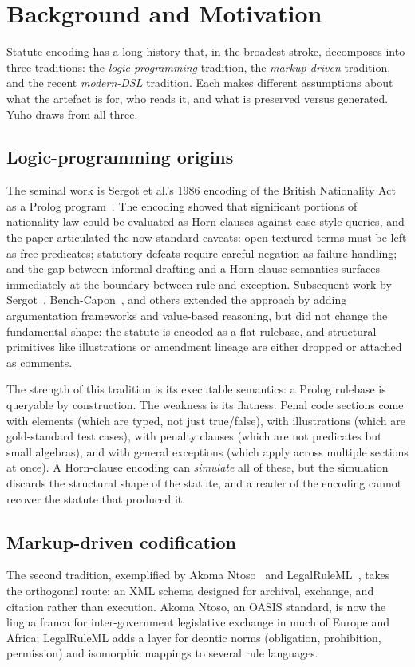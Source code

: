 \section{Background and Motivation}
\label{sec:background}

Statute encoding has a long history that, in the broadest stroke, decomposes
into three traditions: the \emph{logic-programming} tradition, the
\emph{markup-driven} tradition, and the recent \emph{modern-DSL} tradition.
Each makes different assumptions about what the artefact is for, who reads
it, and what is preserved versus generated. Yuho draws from all three.

\subsection{Logic-programming origins}
The seminal work is Sergot et al.'s 1986 encoding of the British Nationality
Act as a Prolog program~\cite{sergot1986british}. The encoding showed that
significant portions of nationality law could be evaluated as Horn clauses
against case-style queries, and the paper articulated the now-standard
caveats: open-textured terms must be left as free predicates; statutory
defeats require careful negation-as-failure handling; and the gap between
informal drafting and a Horn-clause semantics surfaces immediately at the
boundary between rule and exception. Subsequent work by Sergot~\cite{sergot1991representation},
Bench-Capon~\cite{benchcapon2003legal}, and others
extended the approach by adding argumentation frameworks and value-based
reasoning, but did not change the fundamental shape: the statute is encoded
as a flat rulebase, and structural primitives like illustrations or
amendment lineage are either dropped or attached as comments.

The strength of this tradition is its executable semantics: a Prolog rulebase
is queryable by construction. The weakness is its flatness. Penal code
sections come with elements (which are typed, not just true/false), with
illustrations (which are gold-standard test cases), with penalty clauses
(which are not predicates but small algebras), and with general exceptions
(which apply across multiple sections at once). A Horn-clause encoding can
\emph{simulate} all of these, but the simulation discards the structural
shape of the statute, and a reader of the encoding cannot recover the
statute that produced it.

\subsection{Markup-driven codification}
The second tradition, exemplified by Akoma Ntoso~\cite{akomantoso} and
LegalRuleML~\cite{legalruleml}, takes the orthogonal route: an XML schema
designed for archival, exchange, and citation rather than execution. Akoma
Ntoso, an OASIS standard, is now the lingua franca for inter-government
legislative exchange in much of Europe and Africa; LegalRuleML adds a layer
for deontic norms (obligation, prohibition, permission) and isomorphic
mappings to several rule languages.

